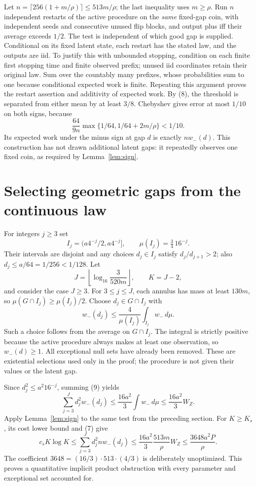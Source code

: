 Let $n=\lceil256(1+m/\rho)\rceil\le513m/\rho$; the last inequality uses
$m\ge\rho$. Run $n$ independent restarts of the active procedure on the
\emph{same} fixed-gap coin, with independent seeds and consecutive unused flip
blocks, and output plus iff their average exceeds $1/2$.
The test is independent of which good gap is supplied. Conditional on its
fixed latent state, each restart has the stated law, and the outputs are iid.
To justify this with unbounded stopping, condition on each finite first stopping
time and finite observed prefix; unused iid coordinates retain their original
law. Sum over the countably many prefixes, whose probabilities sum to one
because conditional expected work is finite. Repeating this argument proves
the restart assertion and additivity of expected work.
By (8), the threshold is separated from either mean by at least $3/8$.
Chebyshev gives error at most $1/10$ on both signs, because
\[
 \frac{64}{9n}\max\{1/64,1/64+2m/\rho\}<1/10.
\]
Its expected work under the minus sign at gap $d$ is exactly $nw_-(d)$.
This construction has not drawn additional latent gaps: it repeatedly observes
one fixed coin, as required by Lemma~\ref{lem:sign}.

\section{Selecting geometric gaps from the continuous law}
For integers $j\ge3$ set
\[
 I_j=(a4^{-j}/2,a4^{-j}],\qquad \mu(I_j)=\tfrac34\,16^{-j}.
\]
Their intervals are disjoint and any choices $d_j\in I_j$ satisfy
$d_j/d_{j+1}>2$; also $d_j\le a/64=1/256<1/128$.
Let
\[
 J=\left\lfloor\log_{16}\frac{3}{520m}\right\rfloor,
 \qquad K=J-2,
\]
and consider the case $J\ge3$. For $3\le j\le J$, each annulus has mass
at least $130m$, so $\mu(G\cap I_j)\ge\mu(I_j)/2$.
Choose $d_j\in G\cap I_j$ with
\[
 w_-(d_j)\le\frac4{\mu(I_j)}\int_{I_j}w_-\,d\mu.       \tag{9}
\]
Such a choice follows from the average on $G\cap I_j$. The integral is strictly
positive because the active procedure always makes at least one observation,
so $w_-(d)\ge1$. All exceptional null sets have already been removed.
These are existential selections used only in the proof; the procedure is not
given their values or the latent gap.

Since $d_j^2\le a^2 16^{-j}$, summing (9) yields
\[
 \sum_{j=3}^Jd_j^2 w_-(d_j)
 \le\frac{16a^2}{3}\int w_-\,d\mu
 \le\frac{16a^2}{3}W_Z.
\]
Apply Lemma~\ref{lem:sign} to the same test from the preceding section.
For $K\ge K_s$, its cost lower bound and (7) give
\[
 c_sK\log K
 \le\sum_{j=3}^Jd_j^2 nw_-(d_j)
 \le\frac{16a^2}{3}\frac{513m}{\rho}W_Z
 \le\frac{3648a^2P}{\rho}.                              \tag{10}
\]
The coefficient $3648=(16/3)\cdot513\cdot(4/3)$ is deliberately unoptimized.
This proves a quantitative implicit product obstruction with every parameter
and exceptional set accounted for.

